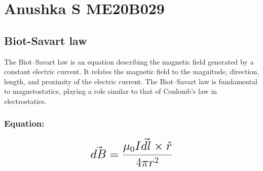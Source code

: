 \section{Anushka S ME20B029}
\subsection{Biot-Savart law}
The Biot–Savart law is an equation describing the magnetic field generated by a constant electric current. It relates the magnetic field to the magnitude, direction, length, and proximity of the electric current. The Biot–Savart law is fundamental to magnetostatics, playing a role similar to that of Coulomb's law in electrostatics.\cite{webref1}

\subsubsection{Equation:}
\begin{equation}
    {\LARGE{\textbf{$\vec{dB}=\frac{\mu_{0} I\vec{dl}\times\hat{r}}{4\pi r^2}$}}}
    \label{eqn}
\end{equation}

